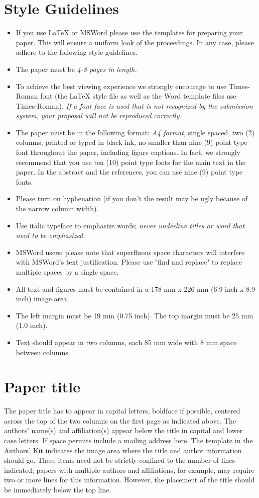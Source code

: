 \documentclass{article}
\begin{document}
\section{Style Guidelines}
\begin{itemize}
\item If you use LaTeX or MSWord please use the templates for
  preparing your paper. This will ensure a uniform look of the
  proceedings. In any case, please adhere to the following style
  guidelines. 
\item The paper must be {\em 4-8 pages in length.}  
\item To achieve the best viewing experience we strongly encourage to
  use Times-Roman font (the LaTeX style file as well as the Word
  template files use Times-Roman). {\em If a font face is used that is not
  recognized by the submission system, your proposal will not be
  reproduced correctly.}
\item The paper must be in the following format: {\em A4 format,} single
  spaced, two (2) columns, printed or typed in black ink, no smaller
  than nine (9) point type font throughout the paper, including figure
  captions. In fact, we strongly recommend that you use ten (10) point
  type fonts for the main text in the paper. In the abstract and the
  references, you can use nine (9) point type fonts. 
\item Please turn on hyphenation (if you don't the result may be ugly
  because of the narrow column width). 
\item Use italic typeface to emphasize words; {\em never underline titles
  or word that need to be emphasized.} 
\item MSWord users: please note that superfluous space characters will
  interfere with MSWord's text justification. Please use "find and
  replace" to replace multiple spaces by a single space.  
\item All text and figures must be contained in a 178 mm x 226 mm (6.9
  inch x 8.9 inch) image area.  
\item The left margin must be 19 mm (0.75 inch). The top margin must
  be 25 mm (1.0 inch). 
\item  Text should appear in two columns, each 85 mm wide with 8 mm
  space between columns.  
\end{itemize}

\section{Paper title}
The paper title has to appear in capital letters, boldface if
possible, centered across the top of the two columns on the first page
as indicated above. The authors' name(s) and affiliation(s) appear
below the title in capital and lower case letters. If space permits
include a mailing address here. The template in the Authors' Kit
indicates the image area where the title and author information should
go. These items need not be strictly confined to the number of lines
indicated; papers with multiple authors and affiliations, for example,
may require two or more lines for this information. However, the
placement of the title should be immediately below the top line. 
\end{document}
